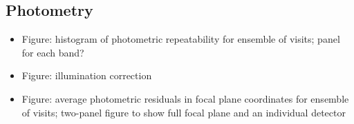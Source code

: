 \subsection{Photometry}
\label{sec:photometry}

\begin{itemize}
    \item Figure: histogram of photometric repeatability for ensemble of visits; panel for each band?
    \item Figure: illumination correction
    \item Figure: average photometric residuals in focal plane coordinates for ensemble of visits; two-panel figure to show full focal plane and an individual detector
\end{itemize}